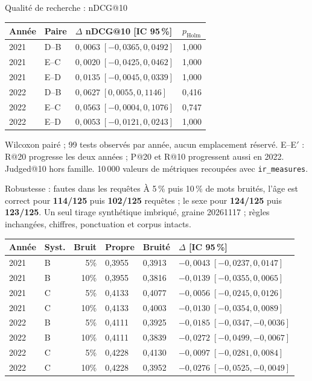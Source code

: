 \documentclass[final]{beamer}
\newlength{\colwidth}
\begin{document}
\begin{frame}[t]
\begin{columns}[t]
\begin{column}{\colwidth}
\begin{block}{Qualité de recherche : nDCG@10}
{\small\begin{tabular*}{\linewidth}{@{\extracolsep{\fill}}llll@{}}
\toprule
Année & Paire & $\Delta$ nDCG@10 [IC 95\,\%] & $p_{\mathrm{Holm}}$ \\
\midrule
2021 & D--B & $0{,}0063\;[-0{,}0365, 0{,}0492]$ & 1,000 \\
2021 & E--C & $0{,}0020\;[-0{,}0425, 0{,}0462]$ & 1,000 \\
2021 & E--D & $0{,}0135\;[-0{,}0045, 0{,}0339]$ & 1,000 \\
2022 & D--B & $0{,}0627\;[0{,}0055, 0{,}1146]$ & 0,416 \\
2022 & E--C & $0{,}0563\;[-0{,}0004, 0{,}1076]$ & 0,747 \\
2022 & E--D & $0{,}0053\;[-0{,}0121, 0{,}0243]$ & 1,000 \\
\bottomrule
\end{tabular*}}

{\small Wilcoxon pairé ; 99 tests observés par année, aucun emplacement réservé. E--E$'$ : R@20 progresse les deux années ; P@20 et R@10 progressent aussi en 2022. Judged@10 hors famille. 10\,000 valeurs de métriques recoupées avec \texttt{ir\_measures}.}
\end{block}
\begin{exampleblock}{Robustesse : fautes dans les requêtes}
À 5\,\% puis 10\,\% de mots bruités, l'âge est correct pour \textbf{114/125} puis \textbf{102/125} requêtes ; le sexe pour \textbf{124/125} puis \textbf{123/125}. Un seul tirage synthétique imbriqué, graine 20261117 ; règles inchangées, chiffres, ponctuation et corpus intacts.

{\small\begin{tabular*}{\linewidth}{@{\extracolsep{\fill}}llrlll@{}}
\toprule
Année & Syst. & Bruit & Propre & Bruité & $\Delta$ [IC 95\,\%] \\
\midrule
    2021 & B & 5\% & 0{,}3955 & 0{,}3913 & $-0{,}0043\;[-0{,}0237, 0{,}0147]$ \\
    2021 & B & 10\% & 0{,}3955 & 0{,}3816 & $-0{,}0139\;[-0{,}0355, 0{,}0065]$ \\
    2021 & C & 5\% & 0{,}4133 & 0{,}4077 & $-0{,}0056\;[-0{,}0245, 0{,}0126]$ \\
    2021 & C & 10\% & 0{,}4133 & 0{,}4003 & $-0{,}0130\;[-0{,}0354, 0{,}0089]$ \\
    \midrule
    2022 & B & 5\% & 0{,}4111 & 0{,}3925 & $-0{,}0185\;[-0{,}0347, -0{,}0036]$ \\
    2022 & B & 10\% & 0{,}4111 & 0{,}3839 & $-0{,}0272\;[-0{,}0499, -0{,}0067]$ \\
    2022 & C & 5\% & 0{,}4228 & 0{,}4130 & $-0{,}0097\;[-0{,}0281, 0{,}0084]$ \\
    2022 & C & 10\% & 0{,}4228 & 0{,}3952 & $-0{,}0276\;[-0{,}0525, -0{,}0049]$ \\
\bottomrule
\end{tabular*}}


\end{exampleblock}
\end{column}
\end{columns}
\end{frame}
\end{document}
